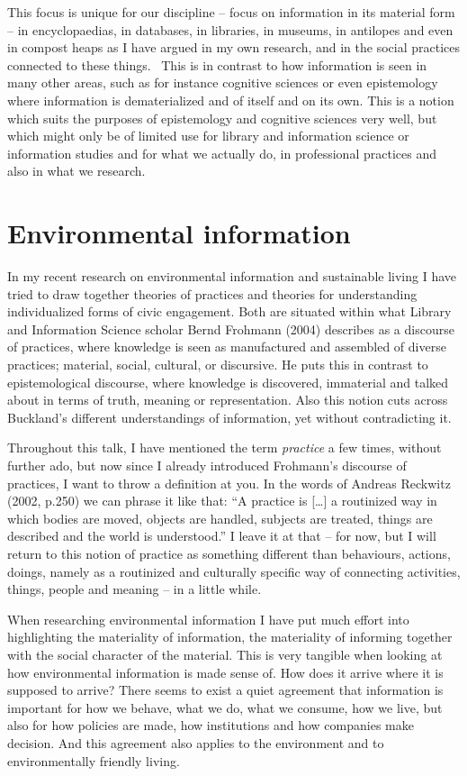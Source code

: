 ﻿\documentclass[a4paper,
fontsize=11pt,
oneside,
numbers=noperiodatend,
parskip=half-,
bibliography=totoc,
final
]{scrartcl}
\begin{document}
This focus is unique for our discipline -- focus on information in its
material form -- in encyclopaedias, in databases, in libraries, in
museums, in antilopes and even in compost heaps as I have argued in my
own research, and in the social practices connected to these things.~
This is in contrast to how information is seen in many other areas, such
as for instance cognitive sciences or even epistemology where
information is dematerialized and of itself and on its own. This is a
notion which suits the purposes of epistemology and cognitive sciences
very well, but which might only be of limited use for library and
information science or information studies and for what we actually do,
in professional practices and also in what we research.

\section*{Environmental
information}\label{environmental-information}

In my recent research on environmental information and sustainable
living I have tried to draw together theories of practices and theories
for understanding individualized forms of civic engagement. Both are
situated within what Library and Information Science scholar Bernd
Frohmann (2004) describes as a discourse of practices, where knowledge
is seen as manufactured and assembled of diverse practices; material,
social, cultural, or discursive. He puts this in contrast to
epistemological discourse, where knowledge is discovered, immaterial and
talked about in terms of truth, meaning or representation. Also this
notion cuts across Buckland's different understandings of information,
yet without contradicting it.

Throughout this talk, I have mentioned the term \emph{practice} a few
times, without further ado, but now since I already introduced
Frohmann's discourse of practices, I want to throw a definition at you.
In the words of Andreas Reckwitz (2002, p.250) we can phrase it like
that: \enquote{A practice is {[}\ldots{}{]} a routinized way in which
bodies are moved, objects are handled, subjects are treated, things are
described and the world is understood.} I leave it at that -- for now,
but I will return to this notion of practice as something different than
behaviours, actions, doings, namely as a routinized and culturally
specific way of connecting activities, things, people and meaning -- in
a little while.

When researching environmental information I have put much effort into
highlighting the materiality of information, the materiality of
informing together with the social character of the material. This is
very tangible when looking at how environmental information is made
sense of. How does it arrive where it is supposed to arrive? There seems
to exist a quiet agreement that information is important for how we
behave, what we do, what we consume, how we live, but also for how
policies are made, how institutions and how companies make decision. And
this agreement also applies to the environment and to environmentally
friendly living.
\end{document}
